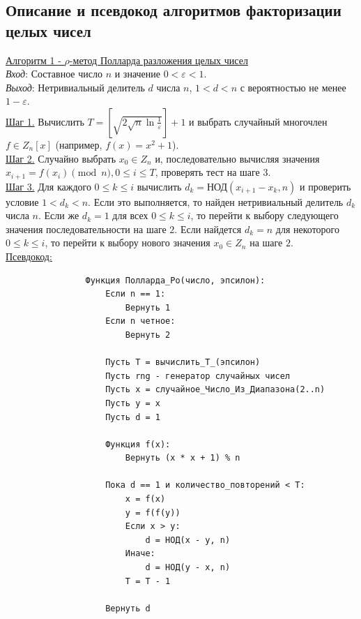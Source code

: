 \documentclass[bachelor, och, labwork]{shiza}
\begin{document}
    \subsection{Описание и псевдокод алгоритмов факторизации целых чисел}

        \underline{Алгоритм 1 - $\rho$-метод Полларда разложения целых чисел}\\
            \textit{Вход}: Составное число $n$ и значение $0 < \varepsilon < 1.$\\
            \textit{Выход}: Нетривиальный делитель $d$ числа $n$, $1 < d < n$ с
            вероятностью не менее $1 - \varepsilon$.\\
            \underline{Шаг 1.} Вычислить $T = \left[\sqrt{2\sqrt{n}\ln
            \frac{1}{\varepsilon}} \right] + 1$ и выбрать случайный многочлен $f
            \in Z_n[x]$ (например, $f(x) = x^2 + 1$).\\
            \underline{Шаг 2.} Случайно выбрать $x_0 \in Z_n$ и, последовательно
            вычисляя значения $x_{i + 1} = f(x_i) \pmod n, 0 \leq i \leq T$,
            проверять тест на шаге $3$.\\
            \underline{Шаг 3.} Для каждого $0 \leq k \leq i$ вычислить $d_k =
            \text{НОД}(x_{i + 1} - x_k, n)$ и проверить условие $1 < d_k < n$.
            Если это выполняется, то найден нетривиальный делитель $d_k$ числа
            $n$. Если же $d_k = 1$ для всех $0 \leq k \leq i$, то перейти к
            выбору следующего значения последовательности на шаге $2$. Если
            найдется $d_k = n$ для некоторого $0 \leq k \leq i$, то перейти к
            выбору нового значения $x_0 \in Z_n$ на шаге $2$.\\
            
        \underline{Псевдокод:}
            \begin{verbatim}
                Функция Полларда_Ро(число, эпсилон):
                    Если n == 1:
                        Вернуть 1
                    Если n четное:
                        Вернуть 2
                    
                    Пусть T = вычислить_T_(эпсилон)
                    Пусть rng - генератор случайных чисел
                    Пусть x = случайное_Число_Из_Диапазона(2..n)
                    Пусть y = x
                    Пусть d = 1
                    
                    Функция f(x):
                        Вернуть (x * x + 1) % n
                    
                    Пока d == 1 и количество_повторений < T:
                        x = f(x)
                        y = f(f(y))
                        Если x > y:
                            d = НОД(x - y, n)
                        Иначе:
                            d = НОД(y - x, n)
                        T = T - 1
                    
                    Вернуть d       
            \end{verbatim}
\end{document}
